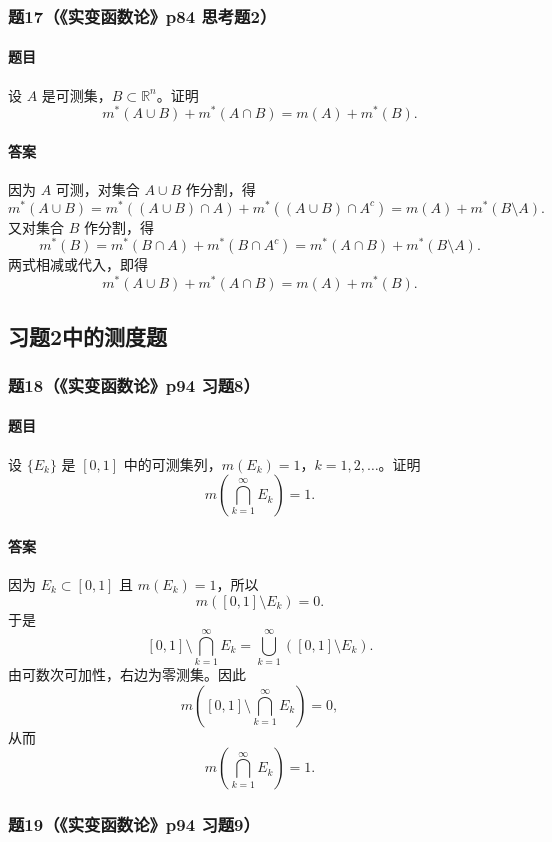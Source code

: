 \documentclass{article}
\newcommand{\R}{\mathbb{R}}
\newcommand{\meas}{m}
\newcommand{\mouter}{m^*}
\begin{document}
	\subsubsection*{题17（《实变函数论》p84 思考题2）}
	\paragraph{题目}设 $A$ 是可测集，$B\subset\R^n$。证明
	\[
	\mouter(A\cup B)+\mouter(A\cap B)=\meas(A)+\mouter(B).
	\]
	
	\paragraph{答案}因为 $A$ 可测，对集合 $A\cup B$ 作分割，得
	\[
	\mouter(A\cup B)
	=\mouter((A\cup B)\cap A)+\mouter((A\cup B)\cap A^c)
	=\meas(A)+\mouter(B\setminus A).
	\]
	又对集合 $B$ 作分割，得
	\[
	\mouter(B)=\mouter(B\cap A)+\mouter(B\cap A^c)
	=\mouter(A\cap B)+\mouter(B\setminus A).
	\]
	两式相减或代入，即得
	\[
	\mouter(A\cup B)+\mouter(A\cap B)=\meas(A)+\mouter(B).
	\]
	
	\subsection{习题2中的测度题}
	
	\subsubsection*{题18（《实变函数论》p94 习题8）}
	\paragraph{题目}设 $\{E_k\}$ 是 $[0,1]$ 中的可测集列，$\meas(E_k)=1$，$k=1,2,\ldots$。证明
	\[
	\meas\left(\bigcap_{k=1}^{\infty}E_k\right)=1.
	\]
	
	\paragraph{答案}因为 $E_k\subset[0,1]$ 且 $\meas(E_k)=1$，所以
	\[
	\meas([0,1]\setminus E_k)=0.
	\]
	于是
	\[
	[0,1]\setminus\bigcap_{k=1}^{\infty}E_k
	=\bigcup_{k=1}^{\infty}([0,1]\setminus E_k).
	\]
	由可数次可加性，右边为零测集。因此
	\[
	\meas\left([0,1]\setminus\bigcap_{k=1}^{\infty}E_k\right)=0,
	\]
	从而
	\[
	\meas\left(\bigcap_{k=1}^{\infty}E_k\right)=1.
	\]
	
	\subsubsection*{题19（《实变函数论》p94 习题9）}
\end{document}
